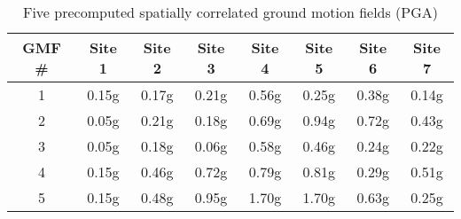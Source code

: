 \begin{table}[htbp]

\centering
\begin{tabular}{ c c c c c c c c }

\hline
\rowcolor{anti-flashwhite}
\bf{GMF \#} & \bf{Site 1} & \bf{Site 2} & \bf{Site 3} & \bf{Site 4} & \bf{Site 5} & \bf{Site 6} & \bf{Site 7}\\
\hline
1 & 0.15g & 0.17g & 0.21g & 0.56g & 0.25g & 0.38g & 0.14g \\
2 & 0.05g & 0.21g & 0.18g & 0.69g & 0.94g & 0.72g & 0.43g \\
3 & 0.05g & 0.18g & 0.06g & 0.58g & 0.46g & 0.24g & 0.22g \\
4 & 0.15g & 0.46g & 0.72g & 0.79g & 0.81g & 0.29g & 0.51g \\
5 & 0.15g & 0.48g & 0.95g & 1.70g & 1.70g & 0.63g & 0.25g \\
\hline
\end{tabular}

\caption{Five precomputed spatially correlated ground motion fields (PGA)}
\label{tab:gmfs-diff-l7-5}
\end{table}